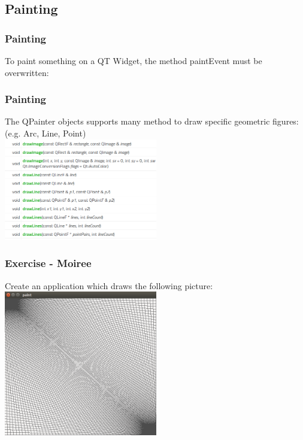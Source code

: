 \subsection{Painting}
\begin{frame}[fragile]
\frametitle{Painting}
To paint something on a QT Widget, the method paintEvent must be overwritten:

\end{frame}

\begin{frame}[fragile]
\frametitle{Painting}
The QPainter objects supports many method to draw specific geometric figures:
	(e.g. Arc, Line, Point)\\
	\vspace{3mm}
        \includegraphics[width=190pt]{img/painter.png}
\end{frame}

\begin{frame}[fragile]
\frametitle{Exercise - Moiree}
Create an application which draws the following picture:
\includegraphics[width=190pt]{img/moiree.png}
\end{frame}

